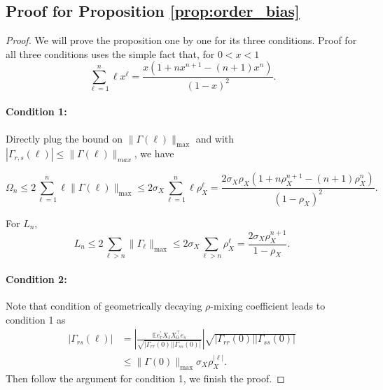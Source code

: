 \subsection{Proof for Proposition \ref{prop:order_bias}}
\begin{proof}
We will prove the proposition one by one for its three conditions. Proof for all three conditions uses the simple fact that, for $0<x<1$
\begin{equation}
\label{eq:sum-help}
\sum_{\ell=1}^n \ell x^\ell = \frac{x(1+nx^{n+1}-(n+1)x^n)}{(1-x)^2}.
\end{equation}

\paragraph{Condition 1:} Directly plug the bound on $\|\Gamma(\ell)\|_{\text{max}}$ and with $|\Gamma_{r,s}(\ell)|\le \|\Gamma(\ell)\|_{max}$, we have 

\begin{equation}
\Omega_n \le 2 \sum_{\ell=1}^n \ell \|\Gamma(\ell)\|_{\text{max}}\le  2 \sigma_X \sum_{\ell=1}^n \ell \rho_X^{\ell} = \frac{2\sigma_X\rho_X (1+n\rho_X^{n+1}-(n+1)\rho_X^n)}{(1-\rho_X)^2}. \nonumber
\end{equation}

For $L_n$, 
\begin{equation}
L_n \le 2\sum_{\ell> n} \|\Gamma_{\ell}\|_{\text{max}} \le 2 \sigma_X \sum_{\ell>n} \rho_X^\ell = \frac{2 \sigma_X \rho_X^{n+1}}{1-\rho_X}. \nonumber
\end{equation}

\paragraph{Condition 2:} Note that condition of geometrically decaying $\rho$-mixing coefficient leads to condition 1 as 
\begin{equation}
\begin{aligned}
|\Gamma_{rs}(\ell)| &= \left|\frac{\mathbb{E} e_r^\prime X_{\ell}X_{0}^\top e_s}{\sqrt{|\Gamma_{rr}(0)||\Gamma_{ss}(0)|}}\right|\sqrt{|\Gamma_{rr}(0)||\Gamma_{ss}(0)|}\\
& \le \|\Gamma(0)\|_{\text{max}}\sigma_X \rho_X^{|\ell|} . \nonumber
\end{aligned}
\end{equation}
Then follow the argument for condition 1, we finish the proof. 



\end{proof}
